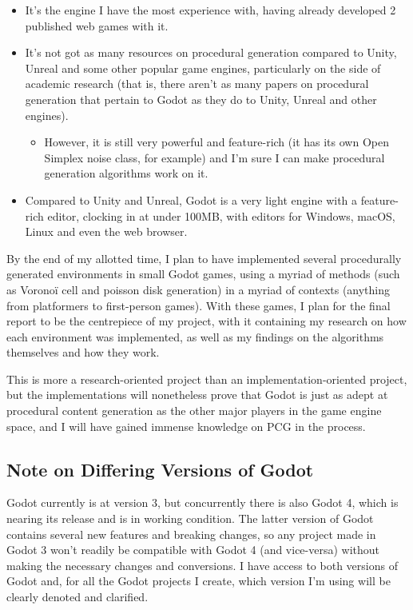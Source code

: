 \begin{itemize}
	\item It's the engine I have the most experience with, having already developed 2 published web games with it.
	\item It's not got as many resources on procedural generation compared to Unity, Unreal and some other popular game engines, particularly on the side of academic research (that is, there aren't as many papers on procedural generation that pertain to Godot as they do to Unity, Unreal and other engines).
	\begin{itemize}
		\item However, it is still very powerful and feature-rich (it has its own Open Simplex noise class, for example) and I'm sure I can make procedural generation algorithms work on it.
	\end{itemize}
	\item Compared to Unity and Unreal, Godot is a very light engine with a feature-rich editor, clocking in at under 100MB, with editors for Windows, macOS, Linux and even the web browser. 
\end{itemize}

By the end of my allotted time, I plan to have implemented several procedurally generated environments in small Godot games, using a myriad of methods (such as Voronoï cell and poisson disk generation) in a myriad of contexts (anything from platformers to first-person games). With these games, I plan for the final report to be the centrepiece of my project, with it containing my research on how each environment was implemented, as well as my findings on the algorithms themselves and how they work.

This is more a research-oriented project than an implementation-oriented project, but the implementations will nonetheless prove that Godot is just as adept at procedural content generation as the other major players in the game engine space, and I will have gained immense knowledge on PCG in the process.

\subsection{Note on Differing Versions of Godot}

Godot currently is at version 3, but concurrently there is also Godot 4, which is nearing its release and is in working condition. The latter version of Godot contains several new features and breaking changes, so any project made in Godot 3 won't readily be compatible with Godot 4 (and vice-versa) without making the necessary changes and conversions. I have access to both versions of Godot and, for all the Godot projects I create, which version I'm using will be clearly denoted and clarified.